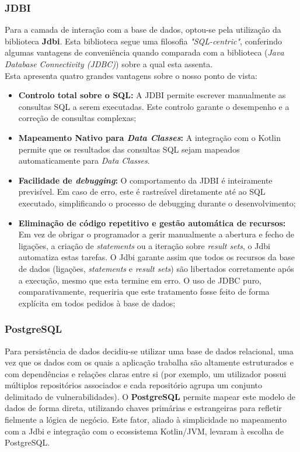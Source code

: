 \subsubsection{JDBI}
Para a camada de interação com a base de dados, optou-se pela utilização da biblioteca \textbf{Jdbi}. Esta biblioteca segue uma filosofia \textit{"SQL-centric"}, conferindo algumas vantagens de conveniência quando comparada com a biblioteca (\textit{Java Database Connectivity (JDBC)}) sobre a qual esta assenta. \\

Esta apresenta quatro grandes vantagens sobre o nosso ponto de vista:

\begin{itemize}
	\item \textbf{Controlo total sobre o SQL:} A JDBI permite escrever manualmente as consultas SQL a serem executadas. Este controlo garante o desempenho e a correção de consultas complexas;
	
	\item \textbf{Mapeamento Nativo para \textit{Data Classes}:} A integração com o Kotlin permite que os resultados das consultas SQL sejam mapeados automaticamente para \textit{Data Classes}. 
	
	\item \textbf{Facilidade de \textit{debugging}:} O comportamento da JDBI é inteiramente previsível. Em caso de erro, este é rastreável diretamente até ao SQL executado, simplificando o processo de debugging durante o desenvolvimento;
	
	\item \textbf{Eliminação de código repetitivo e gestão automática de recursos:} Em vez de obrigar o programador a gerir manualmente a abertura e fecho de ligações, a criação de \textit{statements} ou a iteração sobre \textit{result sets}, o Jdbi automatiza estas tarefas. O Jdbi garante assim que todos os recursos da base de dados (ligações, \textit{statements} e \textit{result sets}) são libertados corretamente após a execução, mesmo que esta termine em erro. O uso de JDBC puro, comparativamente, requeriria que este tratamento fosse feito de forma explícita em todos pedidos à base de dados; 
\end{itemize}

\subsubsection{PostgreSQL}
Para persistência de dados decidiu-se utilizar uma base de dados relacional, uma vez que os dados com os quais a aplicação trabalha são altamente estruturados e com dependências e relações claras entre si (por exemplo, um utilizador possui múltiplos repositórios associados e cada repositório agrupa um conjunto delimitado de vulnerabilidades). O \textbf{PostgreSQL} permite mapear este modelo de dados de forma direta, utilizando chaves primárias e estrangeiras para refletir fielmente a lógica de negócio. Este fator, aliado à simplicidade no mapeamento com a Jdbi e integração com o ecossistema Kotlin/JVM, levaram à escolha de PostgreSQL. \\

